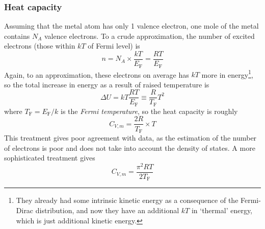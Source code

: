 \subsubsection{Heat capacity}
Assuming that the metal atom has only 1 valence electron, one mole of the metal contains $N_A$ valence electrons. To a crude approximation, the number of excited electrons (those within $kT$ of Fermi level) is
\begin{equation}
	n=N_A\times\frac{kT}{E_{\mathrm{F}}}=\frac{RT}{E_{\mathrm{F}}}
\end{equation}
Again, to an approximation, these electrons on average has $kT$ more in energy\footnote{They already had some intrinsic kinetic energy as a consequence of the Fermi-Dirac distribution, and now they have an additional $kT$ in `thermal' energy, which is just additional kinetic energy.}, so the total increase in energy as a result of raised temperature is
\begin{equation}
	\Delta U=kT\frac{RT}{E_{\mathrm{F}}}\equiv\frac{R}{T_{\mathrm{F}}}T^2
\end{equation}
where $T_{\mathrm{F}}=E_{\mathrm{F}}/k$ is the \emph{Fermi temperature}, so the heat capacity is roughly
\begin{equation}
	C_{V,m}=\frac{2R}{T_{\mathrm{F}}}\times T
\end{equation}
This treatment gives poor agreement with data, as the estimation of the number of electrons is poor and does not take into account the density of states. A more sophisticated treatment gives
\begin{equation}
	C_{V,m}=\frac{\pi^2RT}{2T_{\mathrm{F}}}
\end{equation}
